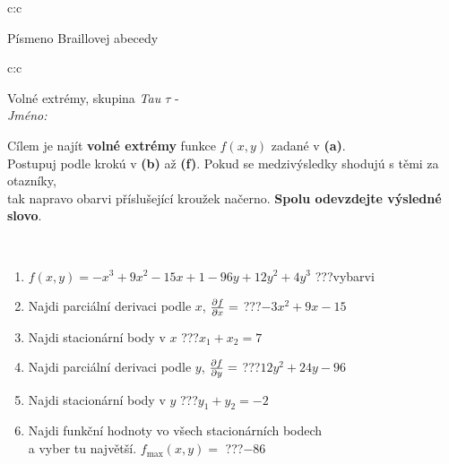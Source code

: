\documentclass[10pt]{report}
\begin{document}
\begin{tabular}{c:c}
\begin{minipage}[c][104.5mm][t]{0.5\linewidth}
\begin{center}
\begin{minipage}{0.20\linewidth}
\begin{center}
{\small Písmeno Braillovej abecedy}
\end{center}
\end{minipage}
\end{center}
\end{minipage}
%
\end{tabular}
\newpage
\thispagestyle{empty}
\begin{tabular}{c:c}
\begin{minipage}[c][104.5mm][t]{0.5\linewidth}
\begin{center}
\vspace{7mm}
{\huge Volné extrémy, skupina \textit{Tau $\tau$} -}\\[5mm]
\textit{Jméno:}\phantom{xxxxxxxxxxxxxxxxxxxxxxxxxxxxxxxxxxxxxxxxxxxxxxxxxxxxxxxxxxxxxxxxx}\\[5mm]
\begin{minipage}{0.95\linewidth}
\begin{center}
Cílem je najít \textbf{volné extrémy} funkce $f(x,y)$ zadané v \textbf{(a)}.\\Postupuj podle krokú v \textbf{(b)} až \textbf{(f)}. Pokud se medzivýsledky shodujú s těmi za otazníky,\\tak napravo obarvi příslušející kroužek načerno. \textbf{Spolu odevzdejte výsledné slovo}.
\end{center}
\end{minipage}
\\[1mm]
\begin{minipage}{0.79\linewidth}
\begin{center}
\begin{varwidth}{\linewidth}
\begin{enumerate}
\normalsize
\item $f(x,y)=-x^3+9x^2-15x+1-96y+12y^2+4y^3$\quad \dotfill\; ???\;\dotfill \quad vybarvi
\item Najdi parciální derivaci podle $x$, $\pdv{f}{x}=$\quad \dotfill\; ???\;\dotfill \quad $-3x^2+9x-15$
\item Najdi stacionární body v $x$\quad \dotfill\; ???\;\dotfill \quad $x_1+x_2=7$
\item Najdi parciální derivaci podle $y$, $\pdv{f}{y}=$\quad \dotfill\; ???\;\dotfill \quad $12y^2+24y-96$
\item Najdi stacionární body v $y$\quad \dotfill\; ???\;\dotfill \quad $y_1+y_2=-2$
\item Najdi funkční hodnoty vo všech stacionárních bodech \\ \phantom{xxxxxx} a vyber tu najvětší. $f_{\text{max}}(x,y)=$\quad \dotfill\; ???\;\dotfill \quad $-86$

\end{enumerate}
\end{varwidth}
\end{center}
\end{minipage}
\end{center}
\end{minipage}
\end{tabular}
\end{document}
